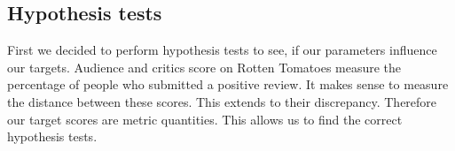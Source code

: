 \documentclass{article}
\begin{document}

\subsection{Hypothesis tests}
    First we decided to perform hypothesis tests to see, if our parameters influence our targets. Audience and critics score on Rotten Tomatoes measure the percentage of people who submitted a positive review. It makes sense to measure the distance between these scores. This extends to their discrepancy. Therefore our target scores are metric quantities. This allows us to find the correct hypothesis tests.
\end{document}
